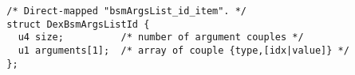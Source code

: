 {\scriptsize \begin{verbatim}
  /* Direct-mapped "bsmArgsList_id_item". */
  struct DexBsmArgsListId {
    u4 size;          /* number of argument couples */
    u1 arguments[1];  /* array of couple {type,[idx|value]} */
  };
\end{verbatim} }
